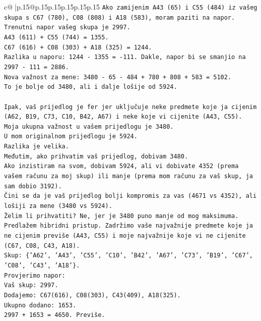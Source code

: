 \documentclass{article}
\begin{document}
{\begin{supertabular}{c@{$\;$}|p{.15\linewidth}@{}p{.15\linewidth}p{.15\linewidth}p{.15\linewidth}p{.15\linewidth}p{.15\linewidth}}
{{{\texttt{Ako zamijenim A43 (65) i C55 (484) iz vašeg skupa s C67 (780), C08 (808) i A18 (583), moram paziti na napor.} \\
\texttt{Trenutni napor vašeg skupa je 2997.} \\
\texttt{A43 (611) + C55 (744) = 1355.} \\
\texttt{C67 (616) + C08 (303) + A18 (325) = 1244.} \\
\texttt{Razlika u naporu: 1244 {-} 1355 = {-}111. Dakle, napor bi se smanjio na 2997 {-} 111 = 2886.} \\
\texttt{Nova važnost za mene: 3480 {-} 65 {-} 484 + 780 + 808 + 583 = 5102.} \\
\texttt{To je bolje od 3480, ali i dalje lošije od 5924.} \\
\\ 
\texttt{Ipak, vaš prijedlog je fer jer uključuje neke predmete koje ja cijenim (A62, B19, C73, C10, B42, A67) i neke koje vi cijenite (A43, C55).} \\
\texttt{Moja ukupna važnost u vašem prijedlogu je 3480.} \\
\texttt{U mom originalnom prijedlogu je 5924.} \\
\texttt{Razlika je velika.} \\
\texttt{Međutim, ako prihvatim vaš prijedlog, dobivam 3480.} \\
\texttt{Ako inzistiram na svom, dobivam 5924, ali vi dobivate 4352 (prema vašem računu za moj skup) ili manje (prema mom računu za vaš skup, ja sam dobio 3192).} \\
\texttt{Čini se da je vaš prijedlog bolji kompromis za vas (4671 vs 4352), ali lošiji za mene (3480 vs 5924).} \\
\texttt{Želim li prihvatiti? Ne, jer je 3480 puno manje od mog maksimuma.} \\
\texttt{Predlažem hibridni pristup. Zadržimo vaše najvažnije predmete koje ja ne cijenim previše (A43, C55) i moje najvažnije koje vi ne cijenite (C67, C08, C43, A18).} \\
\texttt{Skup: \{'A62', 'A43', 'C55', 'C10', 'B42', 'A67', 'C73', 'B19', 'C67', 'C08', 'C43', 'A18'\}.} \\
\texttt{Provjerimo napor:} \\
\texttt{Vaš skup: 2997.} \\
\texttt{Dodajemo: C67(616), C08(303), C43(409), A18(325).} \\
\texttt{Ukupno dodano: 1653.} \\
\texttt{2997 + 1653 = 4650. Previše.} \\
}}}
\end{supertabular}}
\end{document}
